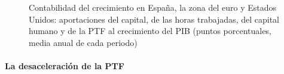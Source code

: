 \documentclass[11pt]{article}
\begin{document}
\begin{figure}[H]
\centering
\caption{Contabilidad del crecimiento en España, la zona del euro y Estados Unidos: aportaciones del capital, de las horas trabajadas, del capital humano y de la PTF al crecimiento del PIB (puntos porcentuales, media anual de cada periodo)}\label{fig:contabilidad-espana}
\end{figure}

\paragraph{La desaceleración de la PTF}
\end{document}
